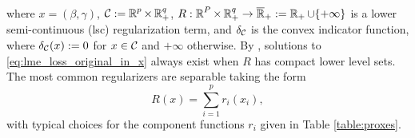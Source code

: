 where $x = (\beta, \gamma)$, 
$\mathcal{C}:=\operatorname{\mathbb{R}}^p\times \operatorname{\mathbb{R}}^q_+$,
$R:\operatorname{\mathbb{R}}^P\times\operatorname{\mathbb{R}}^q_+\rightarrow {\overline{\operatorname{\mathbb{R}}}}_+:=\operatorname{\mathbb{R}}_+\cup\{+\infty\}$
is a 
lower semi-continuous (lsc) regularization term, and
$\delta_{\mathcal{C}}$ is the convex indicator function, where
$\delta_{\mathcal{C}}(x) :=0$ for $x \in \mathcal{C}$ and $+\infty$ otherwise.
By \cite[Theorem 2]{Theory1}, solutions to \eqref{eq:lme_loss_original_in_x}
always exist when $R$ has compact lower level sets.
The most common regularizers are separable taking the form
\begin{equation}\label{eq:R sep}
R(x) = \sum_{i = 1}^p r_i(x_i), 
\end{equation}
with typical choices for the component functions $r_i$ given in Table \ref{table:proxes}.




